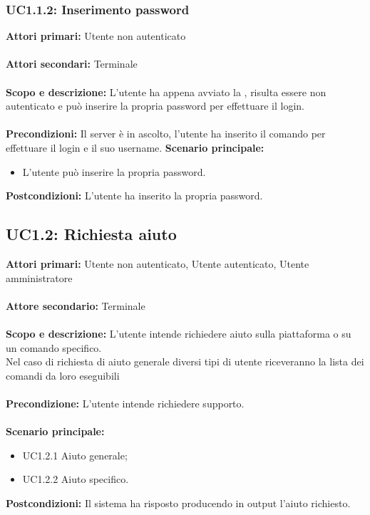 \documentclass{scalatekids-article}
\begin{document}
\subsubsection{UC1.1.2: Inserimento password}

\textbf{Attori primari:} Utente non autenticato\\ \\
\textbf{Attori secondari:} Terminale\\ \\
\textbf{Scopo e descrizione:}
L'utente ha appena avviato la , risulta essere non autenticato e può inserire la propria password per effettuare il login.\\ \\
\textbf{Precondizioni:} Il server è in ascolto, l'utente ha inserito il comando per effettuare il login e il suo username.
\textbf{Scenario principale:}
\begin{itemize}
  \item L'utente può inserire la propria password.
\end{itemize}
\textbf{Postcondizioni:} L'utente ha inserito la propria password.

\subsection{UC1.2: Richiesta aiuto}

\textbf{Attori primari:} Utente non autenticato, Utente autenticato, Utente amministratore\\ \\
\textbf{Attore secondario:} Terminale\\ \\
\textbf{Scopo e descrizione:} L'utente intende richiedere aiuto sulla piattaforma o su un comando specifico.\\Nel caso di richiesta di aiuto generale diversi tipi di utente riceveranno la lista dei comandi da loro eseguibili\\ \\
\textbf{Precondizione:} L'utente intende richiedere supporto.\\ \\
\textbf{Scenario principale:}
\begin{itemize}
  \item UC1.2.1 Aiuto generale;
  \item UC1.2.2 Aiuto specifico.
\end{itemize}
\textbf{Postcondizioni:} Il sistema ha risposto producendo in output l'aiuto richiesto.
\end{document}
